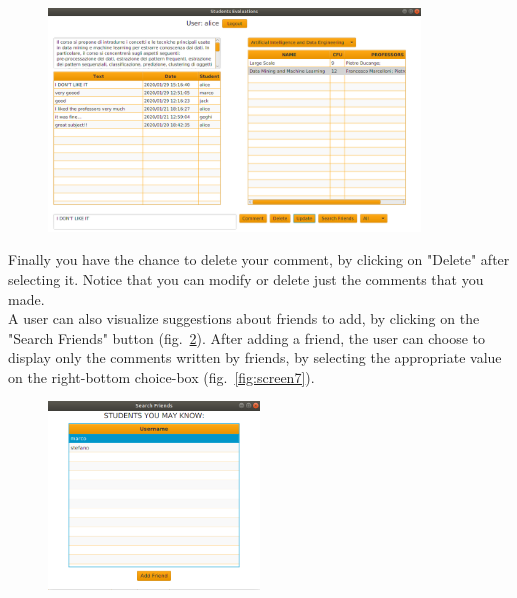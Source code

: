 \documentclass[a4paper]{article}
\begin{document}
\begin{figure}[h]
\centering
\includegraphics[width=0.88\textwidth]{images/screens/screen5}
\label{fig:screen5}
\end{figure}

Finally you have the chance to delete your comment, by clicking on "Delete" after selecting it. Notice that you can modify or delete just the comments that you made.\\
A user can also visualize suggestions about friends to add, by clicking on the "Search Friends" button (fig.~\ref{fig:screen6}). After adding a friend, the user can choose to display only the comments written by friends, by selecting the appropriate value on the right-bottom choice-box (fig.~\ref{fig:screen7}).
\clearpage

\begin{figure}[h]
\centering
\includegraphics[width=0.5\textwidth]{images/screens/screen6}
\label{fig:screen6}
\end{figure}
\end{document}
